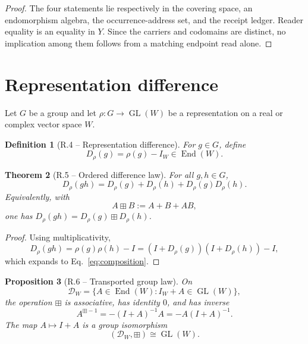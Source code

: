 \documentclass[11pt,letterpaper]{article}
\theoremstyle{returnstyle}
\newtheorem{theorem}{Theorem}[section]
\newtheorem{proposition}[theorem]{Proposition}
\newtheorem{definition}[theorem]{Definition}
\newcommand{\End}{\operatorname{End}}
\newcommand{\GL}{\operatorname{GL}}
\newcommand{\boxplusop}{\mathbin{\boxplus}}
\begin{document}
\begin{proof}
The four statements lie respectively in the covering space, an endomorphism algebra, the occurrence-address set, and the receipt ledger.  Reader equality is an equality in $Y$.  Since the carriers and codomains are distinct, no implication among them follows from a matching endpoint read alone.
\end{proof}

\section{Representation difference}\label{sec:difference}

Let $G$ be a group and let $\rho:G\to\GL(W)$ be a representation on a real or complex vector space $W$.

\begin{definition}[R.4 -- Representation difference]
For $g\in G$, define
\begin{equation}\label{eq:diff}
D_\rho(g)=\rho(g)-I_W\in\End(W).
\end{equation}
\end{definition}

\begin{theorem}[R.5 -- Ordered difference law]\label{thm:composition}
For all $g,h\in G$,
\begin{equation}\label{eq:composition}
D_\rho(gh)
=D_\rho(g)+D_\rho(h)+D_\rho(g)D_\rho(h).
\end{equation}
Equivalently, with
\begin{equation}\label{eq:boxplus}
A\boxplusop B:=A+B+AB,
\end{equation}
one has $D_\rho(gh)=D_\rho(g)\boxplusop D_\rho(h)$.
\end{theorem}

\begin{proof}
Using multiplicativity,
\[
D_\rho(gh)
=\rho(g)\rho(h)-I
=(I+D_\rho(g))(I+D_\rho(h))-I,
\]
which expands to Eq.~\eqref{eq:composition}.
\end{proof}

\begin{proposition}[R.6 -- Transported group law]\label{prop:group-law}
On
\[
\mathcal D_W=\{A\in\End(W):I_W+A\in\GL(W)\},
\]
the operation $\boxplusop$ is associative, has identity $0$, and has inverse
\begin{equation}\label{eq:boxinverse}
A^{\boxplusop-1}=-(I+A)^{-1}A=-A(I+A)^{-1}.
\end{equation}
The map $A\mapsto I+A$ is a group isomorphism
\[
(\mathcal D_W,\boxplusop)\cong\GL(W).
\]
\end{proposition}
\end{document}
